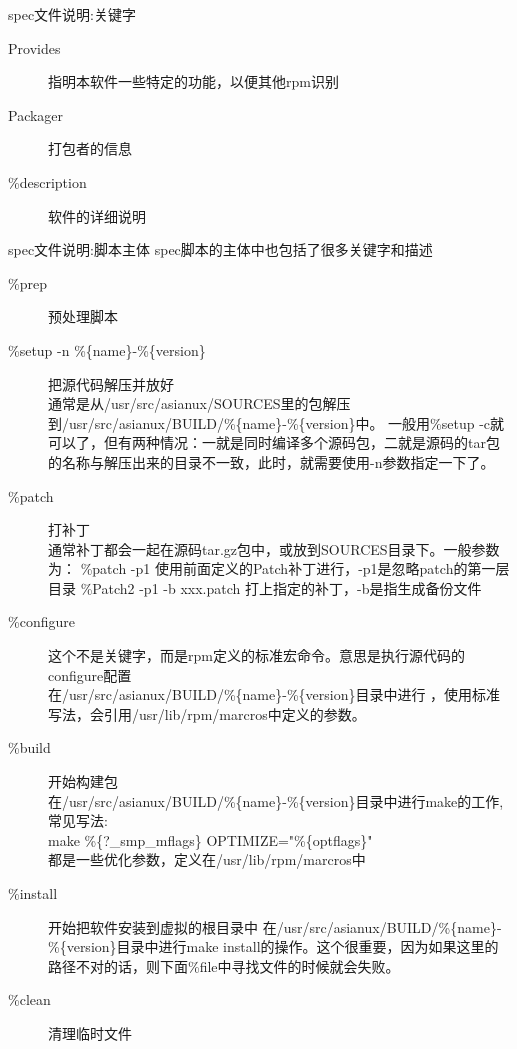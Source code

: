 \begin{frame}{spec文件说明:关键字}
\begin{description}
\item[Provides] 指明本软件一些特定的功能，以便其他rpm识别

\item[Packager] 打包者的信息

\item[\%description] 软件的详细说明
\end{description}

\end{frame}

\begin{frame}[allowframebreaks]{spec文件说明:脚本主体 }
spec脚本的主体中也包括了很多关键字和描述
\begin{description}
\item[\%prep] 预处理脚本
\item[\%setup -n \%\{name\}-\%\{version\}]把源代码解压并放好 \\
通常是从/usr/src/asianux/SOURCES里的包解压到/usr/src/asianux/BUILD/\%\{name\}-\%\{version\}中。
一般用\%setup -c就可以了，但有两种情况：一就是同时编译多个源码包，二就是源码的tar包的名称与解压出来的目录不一致，此时，就需要使用-n参数指定一下了。
\item[\%patch] 打补丁 \\
通常补丁都会一起在源码tar.gz包中，或放到SOURCES目录下。一般参数为：
\%patch -p1 使用前面定义的Patch补丁进行，-p1是忽略patch的第一层目录
\%Patch2 -p1 -b xxx.patch 打上指定的补丁，-b是指生成备份文件

\item[\%configure] 这个不是关键字，而是rpm定义的标准宏命令。意思是执行源代码的configure配置 \\
在/usr/src/asianux/BUILD/\%\{name\}-\%\{version\}目录中进行 ，使用标准写法，会引用/usr/lib/rpm/marcros中定义的参数。

\item[\%build] 开始构建包 \\
在/usr/src/asianux/BUILD/\%\{name\}-\%\{version\}目录中进行make的工作,常见写法: \\
make \%\{?\_smp\_mflags\} OPTIMIZE="\%\{optflags\}" \\
都是一些优化参数，定义在/usr/lib/rpm/marcros中

\item[\%install] 开始把软件安装到虚拟的根目录中
在/usr/src/asianux/BUILD/\%\{name\}-\%\{version\}目录中进行make install的操作。这个很重要，因为如果这里的路径不对的话，则下面\%file中寻找文件的时候就会失败。
\item[\%clean] 清理临时文件


\end{description}
\end{frame}
